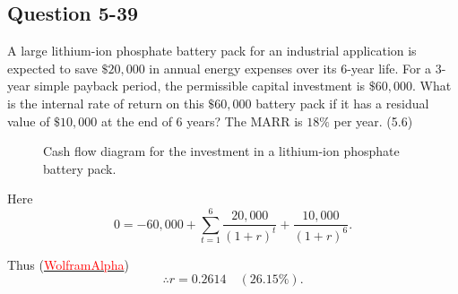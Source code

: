 \documentclass[12pt]{article}
\begin{document}
\newpage
\subsection*{Question 5-39}
\begin{q}
A large lithium-ion phosphate battery pack for an industrial application is expected to save \(\$ 20,000\) in annual energy expenses over its 6-year life. For a 3-year simple payback period, the permissible capital investment is \(\$ 60,000\). What is the internal rate of return on this \(\$ 60,000\) battery pack if it has a residual value of \(\$ 10,000\) at the end of 6 years? The MARR is \(18 \%\) per year. (5.6)
\end{q}


\begin{figure}[!ht]
    \centering
    \caption{Cash flow diagram for the investment in a lithium-ion phosphate battery pack.}
    \label{fig:battery-pack-investment}
\end{figure}

Here
\[
0 = -60,000 + \sum_{t=1}^{6} \frac{20,000}{(1 + r)^t} + \frac{10,000}{(1 + r)^6}.
\]

Thus (\href{https://www.wolframalpha.com/input?i=60000+-+10000%2F%281%2Br%29%5E6%3D+sum+20000%2F%281%2Br%29%5Et+from+t%3D1+to+6}{\textcolor{red}{WolframAlpha}})
\[\therefore \boxed{r = 0.2614 \quad (26.15 \%)}.\]

\newpage
\end{document}
